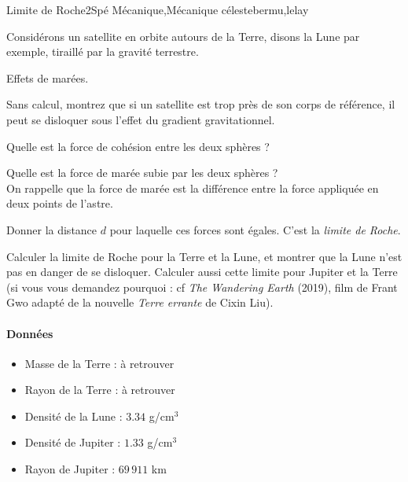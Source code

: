 
\begin{exercise}{Limite de Roche}{2}{Spé}
{Mécanique,Mécanique céleste}{bermu,lelay}

Considérons un satellite en orbite autours de la Terre, disons la Lune par exemple, tiraillé par la gravité terrestre. 

\begin{questions}

    \questioncours Effets de marées.
    
    \question Sans calcul, montrez que si un satellite est trop près de son corps de référence, il peut se disloquer sous l'effet du gradient gravitationnel. 
    
    
    \question Quelle est la force de cohésion entre les deux sphères ?
    
    \question Quelle est la force de marée subie par les deux sphères ? \\ On rappelle que la force de marée est la différence entre la force appliquée en deux points de l'astre.
    
    \question Donner la distance $d$ pour laquelle ces forces sont égales. C'est la \textit{limite de Roche}. 
    
    \question Calculer la limite de Roche pour la Terre et la Lune, et montrer que la Lune n'est pas en danger de se disloquer. Calculer aussi cette limite pour Jupiter et la Terre (si vous vous demandez pourquoi : cf \textit{The Wandering Earth} (2019), film de Frant Gwo adapté de la nouvelle \textit{Terre errante} de Cixin Liu).
 \end{questions}

\paragraph{Données}
\begin{itemize}
    \item Masse de la Terre : à retrouver
    \item Rayon de la Terre : à retrouver
    \item Densité de la Lune : $3.34$ g/cm$^3$
    \item Densité de Jupiter : $1.33$ g/cm$^3$
    \item Rayon de Jupiter : $69\,911$ km
\end{itemize}

\end{exercise}

